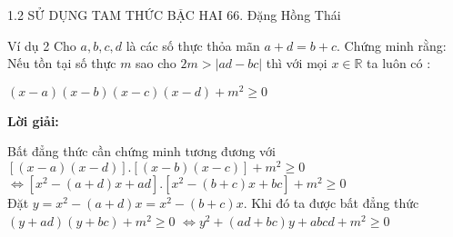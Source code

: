 \begin{frame}{1.2 SỬ DỤNG TAM THỨC BẬC HAI \hspace{3cm}  66. Đặng Hồng Thái} 
    \begin{block}{Ví dụ 2}
        Cho $a,b,c,d$ là các số thực thỏa mãn $a+d=b+c$. Chứng minh rằng: Nếu tồn tại số thực $m$ sao cho $2m>|ad-bc|$ thì với mọi $x\in \mathbb{R} $ ta luôn có : \\
        \begin{center}
            $(x-a)(x-b)(x-c)(x-d)+m^2\geq0$
        \end{center}
    \end{block} 
    \begin{center}
        \textbf{Lời giải:}
    \end{center}
    \pause
        Bất đẳng thức cần chứng minh tương đương với \\
        \vspace{0,2cm}
        \hspace{1cm} $[(x-a)(x-d)].[(x-b)(x-c)]+m^2\geq0$ \\ \pause
        \vspace{0,2cm}
        \hspace{1cm} $\Leftrightarrow [x^2-(a+d)x+ad].[x^2-(b+c)x+bc]+m^2\geq0$ \\
        \vspace{0,2cm} \pause
        Đặt $y=x^2-(a+d)x=x^2-(b+c)x$.  \pause Khi đó ta được bất đẳng thức \\ 
        \vspace{0,2cm}
        \hspace{1cm} $(y+ad)(y+bc)+m^2\geq0$  
        \hspace{1cm} $\Leftrightarrow y^2+(ad+bc)y+abcd+m^2\geq0$ \\
\end{frame}


